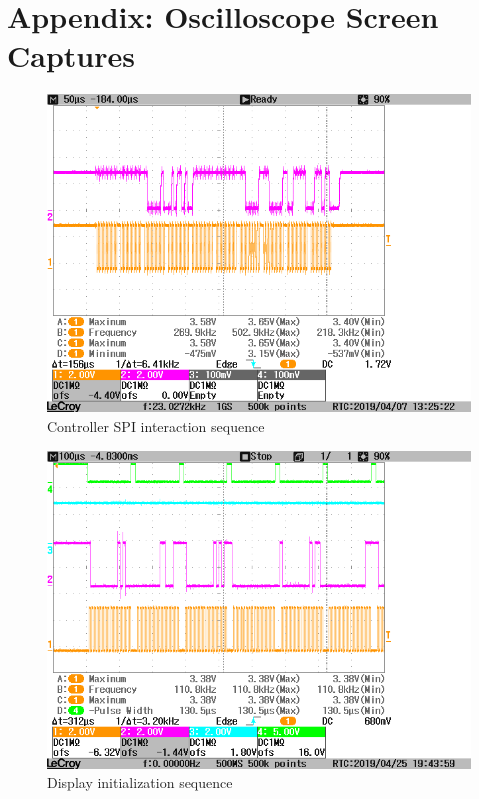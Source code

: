 \documentclass[a4paper, 12pt]{article}
\begin{document}
\section*{Appendix: Oscilloscope Screen Captures}
\begin{figure}[h!]
  \centering
  \includegraphics[scale=.5]{controller.png}
  \caption{Controller SPI interaction sequence}
  \label{fig:sce}
\end{figure}
\begin{figure}[h!]
  \centering
  \includegraphics[scale=.5]{init-display.png}
  \caption{Display initialization sequence}
  \label{fig:stic}
\end{figure}
\end{document}
